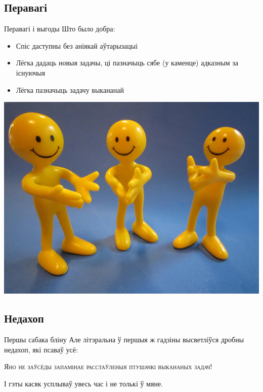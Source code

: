 \documentclass[ignorenonframetext,hyperref={pdftex,unicode}]{beamer}
\begin{document}
\subsection{Перавагі}
\begin{frame}{Перавагі і выгоды}
	Што было добра:
	\begin{itemize}
		\item Спіс даступны без аніякай аўтарызацыі\pause
		\item Лёгка дадаць новыя задачы, ці пазначыць сябе (у каменце) адказным за існуючыя\pause
		\item Лёгка пазначыць задачу выкананай
	\end{itemize}
	\begin{center}
		\includegraphics[height=0.5\textheight,keepaspectratio]{5129669316_a14566600e_z}
	\end{center}
\end{frame}

\subsection{Недахоп}
\begin{frame}{Першы сабака бліну}
	Але літэральна ў першыя ж гадзіны высветліўся дробны недахоп, які псаваў усё:
	\begin{center}
		 \textsc{Яно не заўсёды запамінае расстаўленыя птушачкі выкананых задач!}
	\end{center}
	І гэты касяк усплываў увесь час і не толькі ў мяне.
\end{frame}
\end{document}
